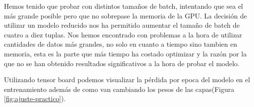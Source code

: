 \begin{enumerate}
\begin{lstlisting}[style=mystyle, label=code:python-3,caption=Ajuste del modelo ]
            \end{lstlisting}

Hemos tenido que probar con distintos tamaños de batch, intentando que sea el más grande posible pero que no sobrepase la memoria de la GPU.
La decisión de utilizar un modelo reducido nos ha permitido aumentar el tamaño de batch de cuatro a diez tuplas. Nos hemos encontrado con problemas a la hora de utilizar cantidades de datos más grandes, no solo en cuanto a tiempo sino tambien en memoria, esta es la parte que más tiempo ha costado optimizar y la razón por la que no se han obtenido resultados significativos a la hora de probar el modelo. 

Utilizando tensor board podemos visualizar la pérdida por epoca del modelo en el entrenamiento además de como van cambiando los pesos de las capas(Figura \ref{fig:ajuste-practico}).


\end{enumerate}
